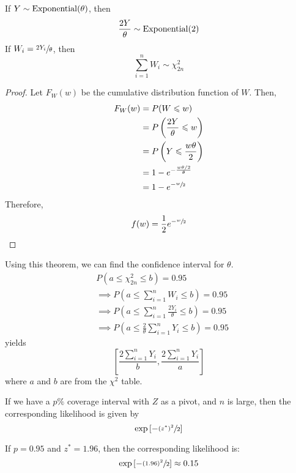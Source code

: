 \begin{thmbox}
    \begin{theorem}
        If $ Y \sim \operatorname{Exponential}(\theta) $, then
        \[ \frac{2Y}{\theta} \sim \operatorname{Exponential}(2) \]
        If $ W_i=\sfrac{2Y_i}{\theta} $, then
        \[ \sum\limits_{i=1}^{n} W_i \sim \chi^2_{2n} \]
    \end{theorem}
\end{thmbox}
\begin{proof}
    Let $ F_W(w) $ be the cumulative distribution function of $ W $. Then,
    \begin{align*}
        F_W(w)
         & =P(W\leqslant w)                               \\
         & =P\left( \frac{2Y}{\theta} \leqslant w \right) \\
         & =P\left( Y\leqslant \frac{w\theta}{2} \right)  \\
         & =1-e^{-\frac{w\theta/2}{\theta}}               \\
         & =1-e^{-\sfrac{w}{2}}
    \end{align*}
    Therefore,
    \[ f(w)=\frac{1}{2} e^{-\sfrac{w}{2}} \]
\end{proof}
Using this theorem, we can find the confidence interval for $ \theta $.
\begin{align*}
     & P\left(a\leqslant \chi^2_{2n}\leqslant b\right)=0.95                                         \\
     & \implies P\left(a \leqslant \sum\limits_{i=1}^{n} W_i \leqslant b\right)=0.95                \\
     & \implies P\left(a\leqslant \sum\limits_{i=1}^{n} \frac{2Y_i}{\theta} \leqslant b\right)=0.95 \\
     & \implies P\left(a\leqslant \frac{2}{\theta} \sum\limits_{i=1}^{n} Y_i\leqslant b\right)=0.95
\end{align*}
yields
\[ \left[ \frac{2 \sum\limits_{i=1}^{n} Y_i}{b} , \frac{2 \sum\limits_{i=1}^{n} Y_i}{a} \right] \]
where $ a $ and $ b $ are from the $ \chi^2 $ table.

\begin{thmbox}
    \begin{theorem}
        If we have a $ p\% $ coverage interval with $ Z $ as a pivot, and $ n $ is large, then
        the corresponding likelihood is given by
        \[ \exp\left[-\sfrac{(z^*)^2}{2}\right] \]
    \end{theorem}
\end{thmbox}

\begin{exbox}
    \begin{example}
        If $ p=0.95 $ and $ z^*=1.96 $, then the corresponding likelihood is:
        \[ \exp\left[-\sfrac{(1.96)^2}{2}\right] \approx 0.15 \]
    \end{example}
\end{exbox}
